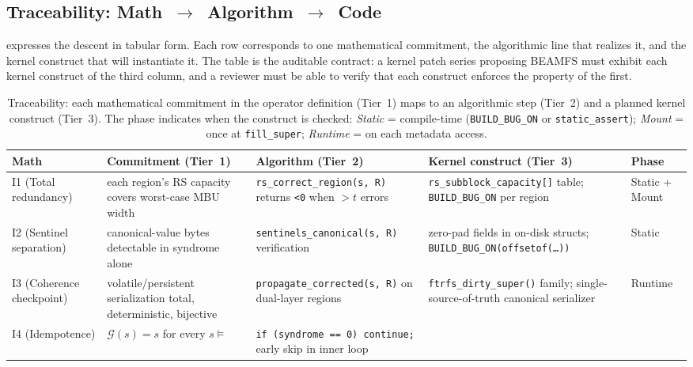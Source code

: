 \subsection{Traceability: Math~\texorpdfstring{$\rightarrow$}{to}~Algorithm~\texorpdfstring{$\rightarrow$}{to}~Code}\label{sec:m2c-trace}

 expresses the descent in tabular form.
Each row corresponds to one mathematical commitment, the
algorithmic line that realizes it, and the kernel construct that
will instantiate it. The table is the auditable contract: a kernel
patch series proposing BEAMFS must exhibit each kernel construct
of the third column, and a reviewer must be able to verify that
each construct enforces the property of the first.

\begin{table}[t]
\centering\small
\caption{Traceability: each mathematical commitment in the operator
definition (Tier~1) maps to an algorithmic step (Tier~2) and a
planned kernel construct (Tier~3). The phase indicates when the
construct is checked: \emph{Static} = compile-time
(\texttt{BUILD\_BUG\_ON} or \texttt{static\_assert});
\emph{Mount} = once at \texttt{fill\_super}; \emph{Runtime} = on
each metadata access.}
\label{tab:traceability}
\begin{tabularx}{\textwidth}{l X X X l}
\toprule
\textbf{Math} & \textbf{Commitment (Tier~1)} & \textbf{Algorithm (Tier~2)} & \textbf{Kernel construct (Tier~3)} & \textbf{Phase} \\
\midrule
I1 (Total redundancy) &
each region's RS capacity covers worst-case MBU width &
\texttt{rs\_correct\_region(s, R)} returns \texttt{<0} when \(>t\) errors &
\texttt{rs\_subblock\_capacity[]} table; \texttt{BUILD\_BUG\_ON} per region &
Static + Mount \\
\addlinespace[0.3em]
I2 (Sentinel separation) &
canonical-value bytes detectable in syndrome alone &
\texttt{sentinels\_canonical(s, R)} verification &
zero-pad fields in on-disk structs; \texttt{BUILD\_BUG\_ON(offsetof(\dots))} &
Static \\
\addlinespace[0.3em]
I3 (Coherence checkpoint) &
volatile/persistent serialization total, deterministic, bijective &
\texttt{propagate\_corrected(s, R)} on dual-layer regions &
\texttt{ftrfs\_dirty\_super()} family; single-source-of-truth canonical serializer &
Runtime \\
\addlinespace[0.3em]
I4 (Idempotence) &
\(\mathcal{G}(s) = s\) for every \(s \models\) &
\texttt{if (syndrome == 0) continue;} early skip in inner loop &

\end{tabularx}
\end{table}
